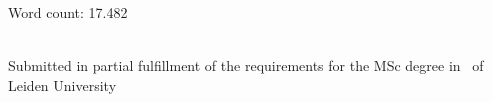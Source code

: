 \begin{titlepage}
\begin{minipage}{0.4\textwidth}
\begin{center} \small
Word count: 17.482 \\
\end{center}
\end{minipage}\\[4cm]



\vfill %
Submitted in partial fulfillment of the requirements for the MSc degree in
\degreetype~of Leiden University\\[0.5cm]

\makeatletter
\@date
\makeatother

\end{titlepage}
